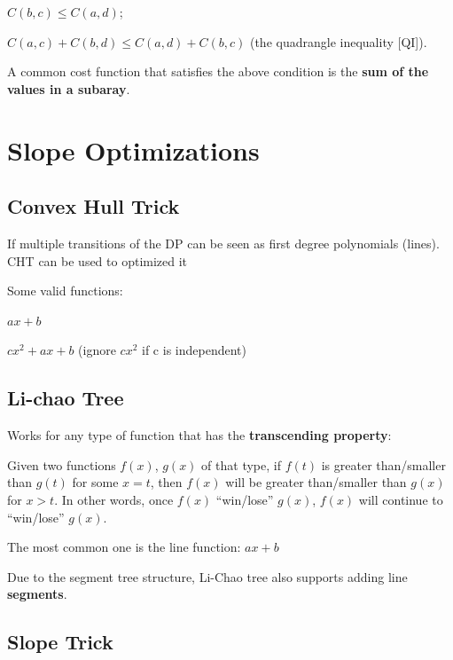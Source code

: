         $C(b, c) \leq C(a, d)$;

        $C(a, c) + C(b, d) \leq C(a, d) + C(b, c)$ (the quadrangle inequality [QI]).

        A common cost function that satisfies the above condition is the \textbf{sum of the values in a subaray}.


\section{Slope Optimizations}

    \subsection{Convex Hull Trick}

        If multiple transitions of the DP can be seen as 
        first degree polynomials (lines). CHT can be used to optimized it

        Some valid functions:

        $ax + b$
        
        $cx^2 + ax + b$ 
        (ignore $cx^2$ if c is independent)


    \subsection{Li-chao Tree}

        Works for any type of function that has the \textbf{transcending property}:

        Given two functions $f(x)$, $g(x)$ of that type, 
        if $f(t)$ is greater than/smaller than $g(t)$ for some $x=t$,
        then $f(x)$ will be greater than/smaller than $g(x)$ for $x>t$.
        In other words, once $f(x)$ “win/lose” $g(x)$, $f(x)$ will continue to “win/lose” $g(x)$.

        The most common one is the line function: $ax + b$

        Due to the segment tree structure, Li-Chao tree also supports adding line \textbf{segments}.


    \subsection{Slope Trick}
    

